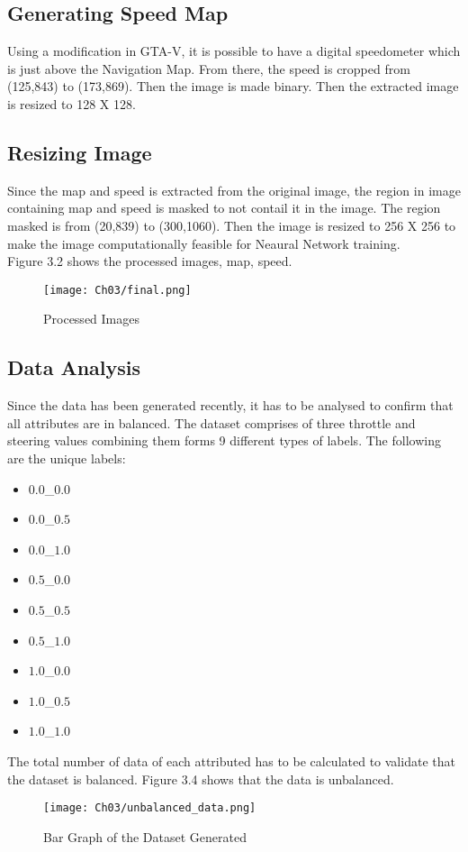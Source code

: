 \subsection{Generating Speed Map}
Using a modification in GTA-V, it is possible to have a digital speedometer which is just above the Navigation Map. From there, the speed is cropped from (125,843) to (173,869). Then the image is made binary. Then the extracted image is resized to 128 X 128.

\subsection{Resizing Image}
Since the map and speed is extracted from the original image, the region in image containing map and speed is masked to not contail it in the image. The region masked is from (20,839) to (300,1060). Then the image is resized to 256 X 256 to make the image computationally feasible for Neaural Network training. 
\\
Figure 3.2 shows the processed images, map, speed.
\begin{figure}[h]
    \centering
    \texttt{[image: Ch03/final.png]}
    \caption{Processed Images}
    \label{figure:3}
\end{figure}
\FloatBarrier

\subsection{Data Analysis}
Since the data has been generated recently, it has to be analysed to confirm that all attributes are in balanced. The dataset comprises of three throttle and steering values combining them forms 9 different types of labels. The following are the unique labels:
\begin{itemize}
    \item $0.0$\_$0.0$
    \item $0.0$\_$0.5$
    \item $0.0$\_$1.0$
    \item $0.5$\_$0.0$
    \item $0.5$\_$0.5$
    \item $0.5$\_$1.0$
    \item $1.0$\_$0.0$
    \item $1.0$\_$0.5$
    \item $1.0$\_$1.0$
\end{itemize}
The total number of data of each attributed has to be calculated to validate that the dataset is balanced. Figure 3.4 shows that the data is unbalanced.
\begin{figure}[h]
    \centering
    \texttt{[image: Ch03/unbalanced\_data.png]}
    \caption{Bar Graph of the Dataset Generated}
    \label{figure:4}
\end{figure}
\FloatBarrier

